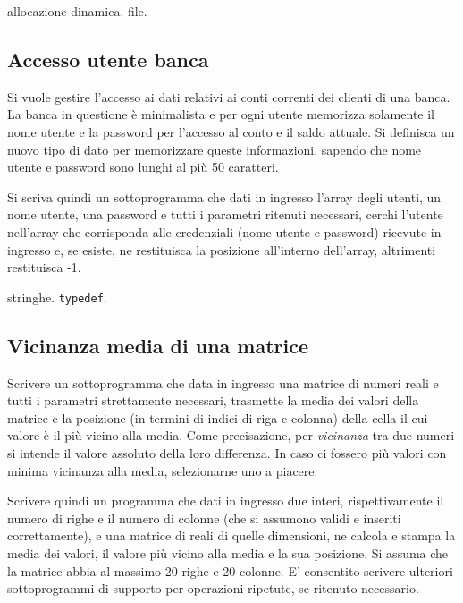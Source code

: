 \begin{tags}
allocazione dinamica. file.
\end{tags}


\subsection{Accesso utente banca}

Si vuole gestire l'accesso ai dati relativi ai conti correnti dei clienti di una banca.
La banca in questione \`e minimalista e per ogni utente memorizza solamente il nome utente e la password per l'accesso al conto e il saldo attuale.
Si definisca un nuovo tipo di dato per memorizzare queste informazioni, sapendo che nome utente e password sono lunghi al pi\`u 50 caratteri.

Si scriva quindi un sottoprogramma che dati in ingresso l'array degli utenti, un nome utente, una password e tutti i parametri ritenuti necessari, cerchi l'utente nell'array che corrisponda alle credenziali (nome utente e password) ricevute in ingresso e, se esiste, ne restituisca la posizione all'interno dell'array, altrimenti restituisca -1.

\begin{tags}
stringhe. \texttt{typedef}.
\end{tags}


\subsection{Vicinanza media di una matrice}

Scrivere un sottoprogramma che data in ingresso una matrice di numeri reali e tutti i parametri strettamente necessari, trasmette la media dei valori della matrice e la posizione (in termini di indici di riga e colonna) della cella il cui valore \`e il pi\`u vicino alla media.
Come precisazione, per \textit{vicinanza} tra due numeri si intende il valore assoluto della loro differenza.
In caso ci fossero pi\`u valori con minima vicinanza alla media, selezionarne uno a piacere.

Scrivere quindi un programma che dati in ingresso due interi, rispettivamente il numero di righe e il numero di colonne (che si assumono validi e inseriti correttamente), e una matrice di reali di quelle dimensioni, ne calcola e stampa la media dei valori, il valore pi\`u vicino alla media e la sua posizione.
Si assuma che la matrice abbia al massimo 20 righe e 20 colonne.
E' consentito scrivere ulteriori sottoprogrammi di supporto per operazioni ripetute, se ritenuto necessario.

